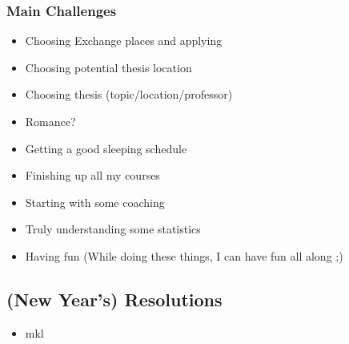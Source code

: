 \documentclass[a4paper]{article}
\begin{document}
\subsubsection{Main Challenges}
\begin{itemize}[label=$\mapsto$]
    \item Choosing Exchange places and applying
    \item Choosing potential thesis location
    \item Choosing thesis (topic/location/professor)
    \item Romance?
    \item Getting a good sleeping schedule
    \item Finishing up all my courses
    \item Starting with some coaching
    \item Truly understanding some statistics
    \item Having fun (While doing these things, I can have fun all along ;)
\end{itemize}

\subsection{(New Year's) Resolutions}
\begin{itemize}
    \item mkl
\end{itemize}
\end{document}
